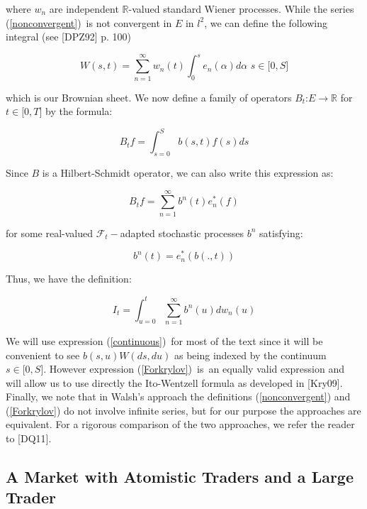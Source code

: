 \documentclass{article}
\begin{document}
where $w_{n}$ are independent $\mathbb{R}$-valued standard Wiener processes.
While the series (\ref{nonconvergent})\ is not convergent in $E$ in $l^{2}$,
we can define the following integral (see [DPZ92] p. 100)

\begin{equation*}
W(s,t)=\sum_{n=1}^{\infty }w_{n}(t)\int_{0}^{s}e_{n}(\alpha )d\alpha \text{
\ \ }s\in \lbrack 0,S]
\end{equation*}

which is our Brownian sheet. We now define a family of operators $B_{t}$:$%
E\rightarrow \mathbb{R}$ for $t\in \lbrack 0,T]$ by the formula:

\begin{equation*}
B_{t}f=\int_{s=0}^{S}b(s,t)f(s)ds
\end{equation*}

Since $B$ is a Hilbert-Schmidt operator, we can also write this expression
as:

\begin{equation*}
B_{t}f=\sum_{n=1}^{\infty }b^{n}(t)e_{n}^{\ast }(f)
\end{equation*}

for some real-valued $\mathcal{F}_{t}-$adapted stochastic processes $b^{n}$
satisfying:

\begin{equation*}
b^{n}(t)=e_{n}^{\ast }(b(.,t))
\end{equation*}

Thus, we have the definition:

\begin{equation}
I_{t}=\int_{u=0}^{t}\sum_{n=1}^{\infty }b^{n}(u)dw_{n}(u)  \label{Forkrylov}
\end{equation}

We will use expression (\ref{continuous})\ for most of the text since it
will be convenient to see $b(s,u)W(ds,du)$ as being indexed by the continuum
$s\in \lbrack 0,S]$. However expression (\ref{Forkrylov})\ is\ an equally
valid expression and will allow us to use directly the Ito-Wentzell formula
as developed in [Kry09]. Finally, we note that in Walsh's approach the
definitions (\ref{nonconvergent}) and (\ref{Forkrylov}) do not involve
infinite series, but for our purpose the approaches are equivalent. For a
rigorous comparison of the two approaches, we refer the reader to [DQ11].

\bigskip

\subsection{A Market with Atomistic Traders and a Large Trader}
\end{document}
